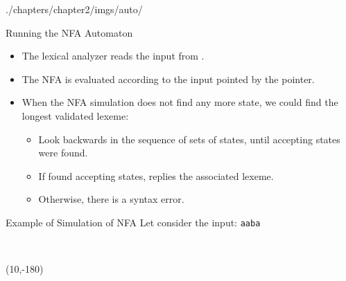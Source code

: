 \begin{graphicspathcontext}{{./chapters/chapter2/imgs/auto/}}
\begin{bibunit}[apalike]

\begin{frame}{Running the NFA Automaton}
	\begin{itemize}
	\item The lexical analyzer reads the input from .
	\item The NFA is evaluated according to the input pointed by the  pointer.
	\vfill
	\item When the NFA simulation does not find any more state, we could find the longest validated lexeme: \begin{itemize}
		\item Look backwards in the sequence of sets of states, until accepting states were found.
		\item If found accepting states, replies the associated lexeme.
		\item Otherwise, there is a syntax error.
		\end{itemize}
	\end{itemize}
\end{frame}


\begin{frame}[t]{Example of Simulation of NFA}
	Let consider the input: \texttt{aaba}
	\begin{center}
		\\
	\end{center}
	\putat(10,-180){\parbox[t]{.9\linewidth}{\normalsize\mdseries\normalcolor
		\begin{footnotesize}
		\end{footnotesize}
	}}
\end{frame}


\end{bibunit}
\end{graphicspathcontext}
